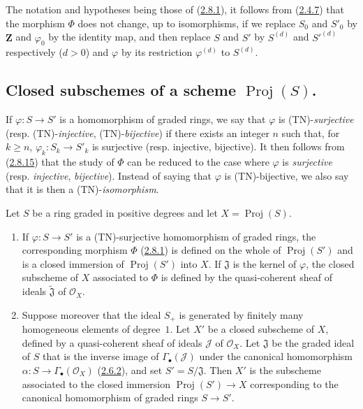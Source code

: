
\begin{env}[2.8.15]
\label{II.2.8.15}
The notation and hypotheses being those of
(\hyperref[II.2.8.1]{2.8.1}), it follows from
(\hyperref[II.2.4.7]{2.4.7}) that the morphism $\Phi$ does not change, up
to isomorphisms, if we replace $S_0$ and $S'_0$ by $\mathbf{Z}$ and
$\varphi_0$ by the identity map, and then replace $S$ and $S'$ by $S^{(d)}$
and ${S'}^{(d)}$ respectively ($d>0$) and $\varphi$ by its restriction
$\varphi^{(d)}$ to $S^{(d)}$.
\end{env}

\subsection{Closed subschemes of a scheme $\operatorname{Proj}(S)$.}
\label{subsection:II.2.9}

\begin{env}[2.9.1]
\label{II.2.9.1}
If $\varphi:S\to S'$ is a homomorphism of graded rings, we say that
$\varphi$ is (TN)-\emph{surjective} (resp. (TN)-\emph{injective},
(TN)-\emph{bijective}) if there exists an integer $n$ such that, for
$k\geq n$, $\varphi_k:S_k\to S'_k$ is surjective (resp. injective,
bijective). It then follows from (\hyperref[II.2.8.15]{2.8.15}) that the
study of $\Phi$ can be reduced to the case where $\varphi$ is
\emph{surjective} (resp. \emph{injective}, \emph{bijective}). Instead of
saying that $\varphi$ is (TN)-bijective, we also say that it is then a
(TN)-\emph{isomorphism}.
\end{env}

\begin{proposition}[2.9.2]
\label{II.2.9.2}
Let $S$ be a ring graded in positive degrees and let
$X=\operatorname{Proj}(S)$.
\begin{enumerate}
  \item[\rm(i)] If $\varphi:S\to S'$ is a (TN)-surjective homomorphism of
    graded rings, the corresponding morphism $\Phi$
    (\hyperref[II.2.8.1]{2.8.1}) is defined on the whole of
    $\operatorname{Proj}(S')$ and is a closed immersion of
    $\operatorname{Proj}(S')$ into $X$. If $\mathfrak{J}$ is the kernel of
    $\varphi$, the closed subscheme of $X$ associated to $\Phi$ is defined by
    the quasi-coherent sheaf of ideals $\widetilde{\mathfrak{J}}$ of
    $\mathcal{O}_X$.
  \item[\rm(ii)] Suppose moreover that the ideal $S_+$ is generated by
    finitely many homogeneous elements of degree~$1$. Let $X'$ be a closed
    subscheme of $X$, defined by a quasi-coherent sheaf of ideals
    $\mathcal{J}$ of $\mathcal{O}_X$. Let $\mathfrak{J}$ be the graded ideal
    of $S$ that is the inverse image of $\Gamma_\bullet(\mathcal{J})$ under the
    canonical homomorphism $\alpha:S\to\Gamma_\bullet(\mathcal{O}_X)$
    (\hyperref[II.2.6.2]{2.6.2}), and set
    $S'=S/\mathfrak{J}$. Then $X'$ is the subscheme associated to the closed
    immersion $\operatorname{Proj}(S')\to X$ corresponding to the canonical
    homomorphism of graded rings $S\to S'$.
\end{enumerate}
\end{proposition}

